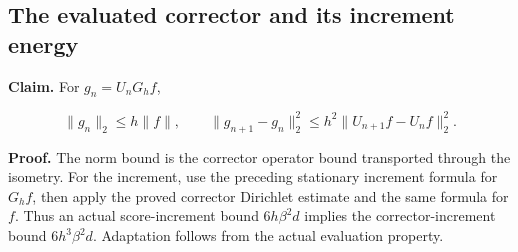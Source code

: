 \documentclass[11pt,a4paper]{report}
\begin{document}
\subsection{\texorpdfstring{The evaluated corrector and its increment energy}{The evaluated corrector and its increment energy}}
\label{report-step-WassersteinMixing-PoissonProcess-lean-2}


\textbf{Claim.} For \(g_n=U_nG_hf\),

\[\|g_n\|_2\le h\|f\|,\qquad \|g_{n+1}-g_n\|_2^2\le h^2\|U_{n+1}f-U_nf\|_2^2.\]

\textbf{Proof.} The norm bound is the corrector operator bound transported through the isometry. For the increment, use the preceding stationary increment formula for \(G_hf\), then apply the proved corrector Dirichlet estimate and the same formula for \(f\). Thus an actual score-increment bound \(6h\beta^2d\) implies the corrector-increment bound \(6h^3\beta^2d\). Adaptation follows from the actual evaluation property.
\end{document}

